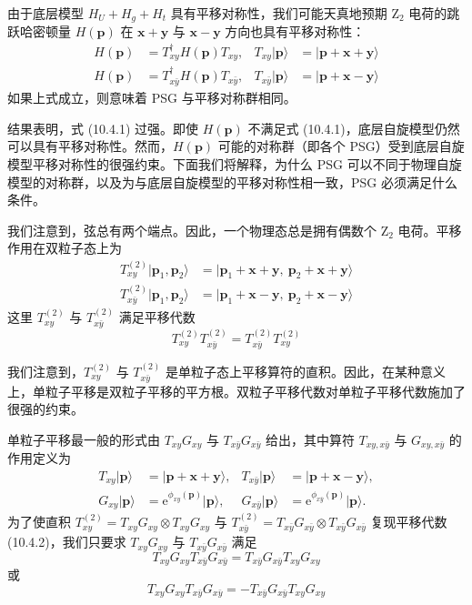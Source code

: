 由于底层模型 $H_U+H_g+H_t$ 具有平移对称性，我们可能天真地预期 Z$_2$ 电荷的跳跃哈密顿量 $H(\pmb{p})$ 在 $\pmb{x}+\pmb{y}$ 与 $\pmb{x}-\pmb{y}$ 方向也具有平移对称性：
\begin{align*}
H(\pmb{p})&=T_{xy}^{\dagger}H(\pmb{p})T_{xy}, & T_{xy}|\pmb{p}\rangle&=|\pmb{p}+\pmb{x}+\pmb{y}\rangle\\
H(\pmb{p})&=T_{x\bar{y}}^{\dagger}H(\pmb{p})T_{x\bar{y}}, & T_{x\bar{y}}|\pmb{p}\rangle&=|\pmb{p}+\pmb{x}-\pmb{y}\rangle\tag{10.4.1}
\end{align*}
如果上式成立，则意味着 PSG 与平移对称群相同。

结果表明，式 (10.4.1) 过强。即使 $H(\pmb{p})$ 不满足式 (10.4.1)，底层自旋模型仍然可以具有平移对称性。然而，$H(\pmb{p})$ 可能的对称群（即各个 PSG）受到底层自旋模型平移对称性的很强约束。下面我们将解释，为什么 PSG 可以不同于物理自旋模型的对称群，以及为与底层自旋模型的平移对称性相一致，PSG 必须满足什么条件。

我们注意到，弦总有两个端点。因此，一个物理态总是拥有偶数个 Z$_2$ 电荷。平移作用在双粒子态上为
\begin{align*}
T_{xy}^{(2)}|\pmb{p}_1,\pmb{p}_2\rangle&=|\pmb{p}_1+\pmb{x}+\pmb{y},\ \pmb{p}_2+\pmb{x}+\pmb{y}\rangle\\
T_{x\bar{y}}^{(2)}|\pmb{p}_1,\pmb{p}_2\rangle&=|\pmb{p}_1+\pmb{x}-\pmb{y},\ \pmb{p}_2+\pmb{x}-\pmb{y}\rangle
\end{align*}
这里 $T_{xy}^{(2)}$ 与 $T_{x\bar{y}}^{(2)}$ 满足平移代数
\begin{equation*}
T_{xy}^{(2)}T_{x\bar{y}}^{(2)}=T_{x\bar{y}}^{(2)}T_{xy}^{(2)}\tag{10.4.2}
\end{equation*}

我们注意到，$T_{xy}^{(2)}$ 与 $T_{x\bar{y}}^{(2)}$ 是单粒子态上平移算符的直积。因此，在某种意义上，单粒子平移是双粒子平移的平方根。双粒子平移代数对单粒子平移代数施加了很强的约束。

单粒子平移最一般的形式由 $T_{xy}G_{xy}$ 与 $T_{x\bar{y}}G_{x\bar{y}}$ 给出，其中算符 $T_{xy,x\bar{y}}$ 与 $G_{xy,x\bar{y}}$ 的作用定义为
\begin{align*}
T_{xy}|\pmb{p}\rangle&=|\pmb{p}+\pmb{x}+\pmb{y}\rangle, & T_{x\bar{y}}|\pmb{p}\rangle&=|\pmb{p}+\pmb{x}-\pmb{y}\rangle,\\
G_{xy}|\pmb{p}\rangle&=\mathrm{e}^{\phi_{xy}(\pmb{p})}|\pmb{p}\rangle, & G_{x\bar{y}}|\pmb{p}\rangle&=\mathrm{e}^{\phi_{x\bar{y}}(\pmb{p})}|\pmb{p}\rangle.
\end{align*}
为了使直积 $T_{xy}^{(2)}=T_{xy}G_{xy}\otimes T_{xy}G_{xy}$ 与 $T_{x\bar{y}}^{(2)}=T_{x\bar{y}}G_{x\bar{y}}\otimes T_{x\bar{y}}G_{x\bar{y}}$ 复现平移代数 (10.4.2)，我们只要求 $T_{xy}G_{xy}$ 与 $T_{x\bar{y}}G_{x\bar{y}}$ 满足
\begin{equation*}
T_{xy}G_{xy}T_{x\bar{y}}G_{x\bar{y}}=T_{x\bar{y}}G_{x\bar{y}}T_{xy}G_{xy}\tag{10.4.3}
\end{equation*}
或
\begin{equation*}
T_{xy}G_{xy}T_{x\bar{y}}G_{x\bar{y}}=-T_{x\bar{y}}G_{x\bar{y}}T_{xy}G_{xy}\tag{10.4.4}
\end{equation*}

